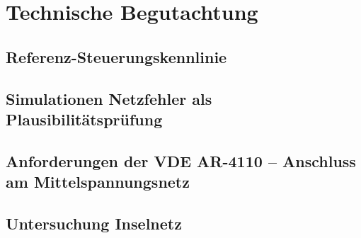 \section{Technische Begutachtung}

\subsection{Referenz-Steuerungskennlinie}

\subsection{Simulationen Netzfehler als Plausibilitätsprüfung}

\subsection{Anforderungen der VDE AR-4110 {--} Anschluss am Mittelspannungsnetz}

\subsection{Untersuchung Inselnetz}